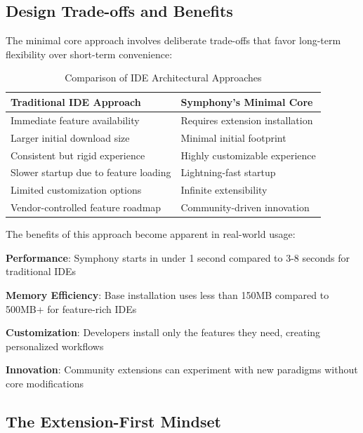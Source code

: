 \subsection*{Design Trade-offs and Benefits}

The minimal core approach involves deliberate trade-offs that favor long-term flexibility over short-term convenience:

\begin{table}[ht]
\centering
\begin{tabular}{@{}p{}p{}@{}}
\toprule
\textbf{Traditional IDE Approach} & \textbf{Symphony's Minimal Core} \\
\midrule
Immediate feature availability & Requires extension installation \\
Larger initial download size & Minimal initial footprint \\
Consistent but rigid experience & Highly customizable experience \\
Slower startup due to feature loading & Lightning-fast startup \\
Limited customization options & Infinite extensibility \\
Vendor-controlled feature roadmap & Community-driven innovation \\
\bottomrule
\end{tabular}
\caption{Comparison of IDE Architectural Approaches}
\end{table}

The benefits of this approach become apparent in real-world usage:

\begin{expandedlist}
    \item \textbf{Performance}: Symphony starts in under 1 second compared to 3-8 seconds for traditional IDEs
    \item \textbf{Memory Efficiency}: Base installation uses less than 150MB compared to 500MB+ for feature-rich IDEs
    \item \textbf{Customization}: Developers install only the features they need, creating personalized workflows
    \item \textbf{Innovation}: Community extensions can experiment with new paradigms without core modifications
\end{expandedlist}

\subsection*{The Extension-First Mindset}

